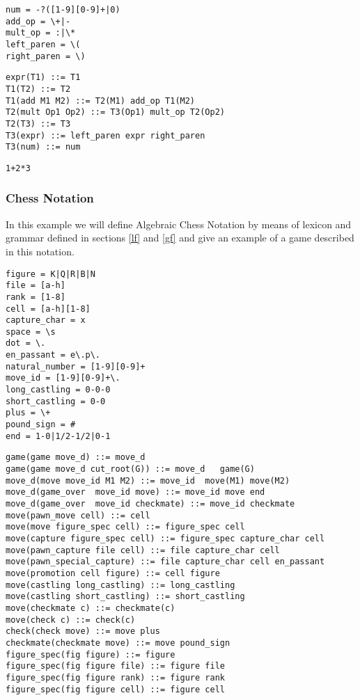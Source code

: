\documentclass[a4paper,10pt]{article}
\newcounter{subsubsubsection}[subsubsection]
\begin{document}
\label{alex}
\begin{verbatim}
num = -?([1-9][0-9]+|0)
add_op = \+|-
mult_op = :|\*
left_paren = \(
right_paren = \)
\end{verbatim} 
\label{agram}

\begin{verbatim}
expr(T1) ::= T1
T1(T2) ::= T2
T1(add M1 M2) ::= T2(M1) add_op T1(M2)
T2(mult Op1 Op2) ::= T3(Op1) mult_op T2(Op2)
T2(T3) ::= T3
T3(expr) ::= left_paren expr right_paren
T3(num) ::= num   
\end{verbatim}
 
\label{asf}
\begin{verbatim}
1+2*3
\end{verbatim}
\subsubsection{Chess Notation}
In this example we will define Algebraic Chess Notation \cite{chess} by means of lexicon and grammar defined in sections \ref{lf} and \ref{gf} and give an example of a game described in this notation. 
\label{clex}
\begin{verbatim}
figure = K|Q|R|B|N
file = [a-h]
rank = [1-8]
cell = [a-h][1-8]
capture_char = x
space = \s
dot = \.
en_passant = e\.p\.
natural_number = [1-9][0-9]+
move_id = [1-9][0-9]+\.
long_castling = 0-0-0
short_castling = 0-0
plus = \+
pound_sign = #
end = 1-0|1/2-1/2|0-1
\end{verbatim}
\label{cgram}
\begin{verbatim}
game(game move_d) ::= move_d 
game(game move_d cut_root(G)) ::= move_d   game(G)
move_d(move move_id M1 M2) ::= move_id  move(M1) move(M2)
move_d(game_over  move_id move) ::= move_id move end
move_d(game_over  move_id checkmate) ::= move_id checkmate 
move(pawn_move cell) ::= cell
move(move figure_spec cell) ::= figure_spec cell
move(capture figure_spec cell) ::= figure_spec capture_char cell
move(pawn_capture file cell) ::= file capture_char cell
move(pawn_special_capture) ::= file capture_char cell en_passant
move(promotion cell figure) ::= cell figure
move(castling long_castling) ::= long_castling
move(castling short_castling) ::= short_castling
move(checkmate c) ::= checkmate(c)
move(check c) ::= check(c)
check(check move) ::= move plus
checkmate(checkmate move) ::= move pound_sign
figure_spec(fig figure) ::= figure
figure_spec(fig figure file) ::= figure file
figure_spec(fig figure rank) ::= figure rank
figure_spec(fig figure cell) ::= figure cell
\end{verbatim}
\end{document}
